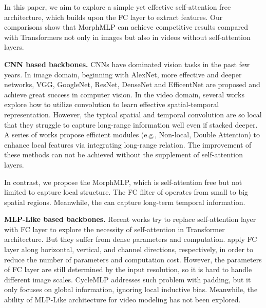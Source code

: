 \documentclass[runningheads]{llncs}
\begin{document}
In this paper,
we aim to explore a simple yet effective self-attention free architecture, which builds upon the FC layer to extract features.  Our comparisons show that  MorphMLP can achieve competitive results compared with Transformers not only in images but also in videos without self-attention layers.


\noindent
\textbf{CNN based backbones.} CNNs \cite{senet,mobilenetv1,mobilenetv2,regnet,resnext,li2020hard,li2021else} have dominated vision tasks in the past few years. 
In image domain, beginning with AlexNet\cite{alexnet}, more effective and deeper networks, 
VGG\cite{vgg}, GoogleNet\cite{google}, ResNet\cite{resnet}, DenseNet\cite{densenet} and EfficentNet\cite{efficientnet} are proposed and achieve great success in computer vision.  In the video domain, several works\cite{c3d,i3d,r(2+1)d,slowfast} explore how to utilize convolution to learn effective spatial-temporal representation. 
However, the typical spatial and temporal convolution are so local that they struggle to capture long-range information well even if stacked deeper. 
A series of works propose efficient modules
(e.g., Non-local\cite{non_local}, Double Attention\cite{double_attention}) to  enhance local features via integrating long-range relation. The improvement of these methods can not be achieved without the supplement of self-attention layers.


In contrast, we propose the MorphMLP, which is self-attention free but not limited to capture local structure. The FC filter of  operates from small to big spatial regions. Meanwhile, the  can capture long-term temporal information.   






\noindent\textbf{MLP-Like based backbones.}
Recent works\cite{resmlp,gmlp,mixer,smlp} try to  replace self-attention layer with FC layer to explore the necessity of self-attention in Transformer architecture. But they suffer from dense parameters and computation. 
\cite{vip,hire,sparse} apply FC layer along  horizontal, vertical, and channel directions, respectively, 
in order to reduce the number of parameters and computation cost. 
However, the parameters of FC layer are still determined by the input resolution, so it is hard to handle different image scales. 
CycleMLP \cite{cyclemlp} addresses such problem with padding,
but it only focuses on global information, 
ignoring local inductive bias. 
Meanwhile, the ability of MLP-Like architecture for video modeling has not been explored. 
\end{document}
